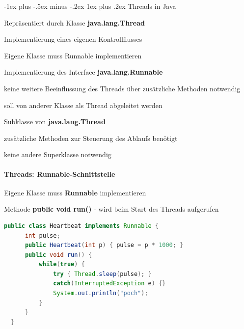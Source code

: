 \documentclass[10pt]{article}
\makeatletter
\renewcommand{\subsubsection}{\@startsection{subsubsection}{3}{0mm}%
                                {-1ex plus -.5ex minus -.2ex}%
                                {1ex plus .2ex}%
                                {\normalfont\small\bfseries}}
\makeatother
\begin{document}
\subsubsection{Threads in Java}
\begin{itemize*}
  \item Repräsentiert durch Klasse \textbf{java.lang.Thread}
  \item Implementierung eines eigenen Kontrollflusses
  \item Eigene Klasse muss Runnable implementieren
  \begin{itemize*}
    \item Implementierung des Interface \textbf{java.lang.Runnable}
    \begin{itemize*}
      \item keine weitere Beeinflussung des Threads über zusätzliche Methoden notwendig
      \item soll von anderer Klasse als Thread abgeleitet werden
    \end{itemize*}
    \item Subklasse von \textbf{java.lang.Thread}
    \begin{itemize*}
      \item zusätzliche Methoden zur Steuerung des Ablaufs benötigt
      \item keine andere Superklasse notwendig
    \end{itemize*}
  \end{itemize*}
\end{itemize*}

\paragraph{Threads: Runnable-Schnittstelle}
Eigene Klasse muss \textbf{Runnable} implementieren
\begin{itemize*}
  \item Methode \textbf{public void run()} - wird beim Start des Threads aufgerufen
\end{itemize*}
\begin{lstlisting}[language=java]
  public class Heartbeat implements Runnable {
      int pulse;
      public Heartbeat(int p) { pulse = p * 1000; }
      public void run() {
          while(true) {
              try { Thread.sleep(pulse); }
              catch(InterruptedException e) {}
              System.out.println("poch");
          }
      }
  }
  \end{lstlisting}
\end{document}
